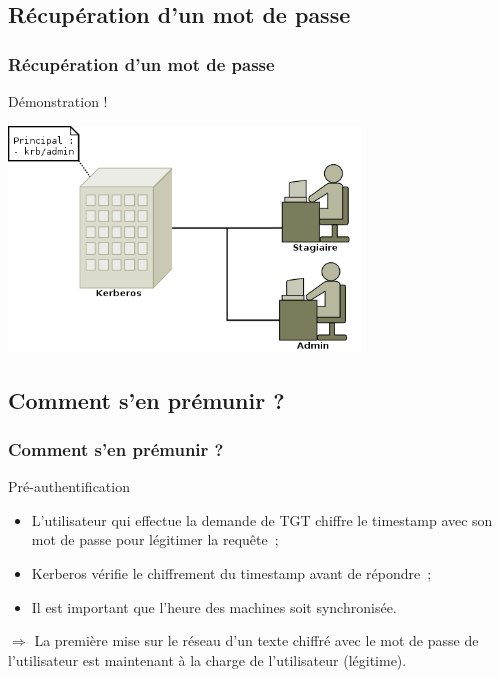 \documentclass[svgnames]{beamer}
\begin{document}
\subsection{Récupération d'un mot de passe}
\begin{frame}
 \frametitle{Récupération d'un mot de passe}
 
 \begin{center}
  Démonstration !
  
  \includegraphics[width=0.7\textwidth]{images/demonstration.png}

 \end{center}
\end{frame}


\subsection{Comment s'en prémunir ?}

\begin{frame}
 \frametitle{Comment s'en prémunir ?}
 
 \begin{block}{Pré-authentification}
  \begin{itemize}
   \item L'utilisateur qui effectue la demande de TGT chiffre le timestamp avec son mot de passe pour légitimer la requête~;
   \item Kerberos vérifie le chiffrement du timestamp avant de répondre~;
   \item Il est important que l'heure des machines soit synchronisée. %
  \end{itemize}
 \end{block}
 
 \pause
 
 $\Rightarrow$ La première mise sur le réseau d'un texte chiffré avec le mot de passe de l'utilisateur est maintenant à la charge de l'utilisateur (légitime).

\end{frame}
\end{document}
